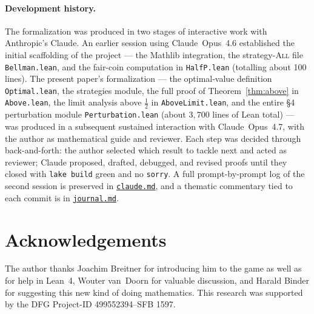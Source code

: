\documentclass[reqno,final,11pt]{amsart}
\theoremstyle{plain}
\theoremstyle{definition}
\theoremstyle{remark}
\newcommand{\All}{\textsc{All}}
\begin{document}
\paragraph{Development history.}
The formalization was produced in two stages of interactive work
with Anthropic's Claude.  An earlier session using Claude~Opus~4.6
established the initial scaffolding of the project --- the
Mathlib integration, the strategy-\All{} file
\texttt{Bellman.lean}, and the fair-coin computation in
\texttt{HalfP.lean} (totalling about 100 lines).  The present
paper's formalization --- the optimal-value definition
\texttt{Optimal.lean}, the strategies module, the full proof of
Theorem~\ref{thm:above} in \texttt{Above.lean}, the limit
analysis above $\tfrac12$ in \texttt{AboveLimit.lean}, and the
entire \S4 perturbation module \texttt{Perturbation.lean} (about
$3{,}700$ lines of Lean total) --- was produced in a subsequent
sustained interaction with Claude~Opus~4.7, with the author as
mathematical guide and reviewer.  Each step was decided through
back-and-forth: the author selected which result to tackle next
and acted as reviewer; Claude proposed, drafted, debugged, and
revised proofs until they closed with \texttt{lake build} green and
no \texttt{sorry}.  A full prompt-by-prompt log of the second
session is preserved in
\href{https://github.com/pfaffelh/coins/blob/main/claude.md}{\texttt{claude.md}},
and a thematic commentary tied to each commit is in
\href{https://github.com/pfaffelh/coins/blob/main/journal.md}{\texttt{journal.md}}.

\section*{Acknowledgements}

The author thanks Joachim Breitner for introducing him to the
game as well as for help in Lean~4, Wouter van~Doorn for valuable discussion, 
and Harald Binder for suggesting this new kind of doing mathematics.
This research was supported by the DFG Project-ID 499552394–SFB 1597.


\nocite{DubinsSavage1965}


\end{document}
